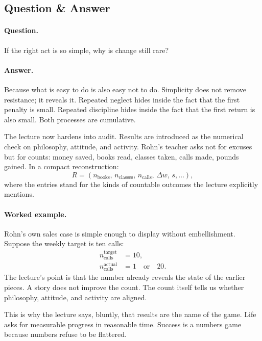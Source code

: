 \subsection{Question \& Answer}

\paragraph{Question.} If the right act is so simple, why is change still rare?

\paragraph{Answer.} Because what is easy to do is also easy not to do. Simplicity does not remove resistance; it reveals it. Repeated neglect hides inside the fact that the first penalty is small. Repeated discipline hides inside the fact that the first return is also small. Both processes are cumulative.

The lecture now hardens into audit. Results are introduced as the numerical check on philosophy, attitude, and activity. Rohn's teacher asks not for excuses but for counts: money saved, books read, classes taken, calls made, pounds gained. In a compact reconstruction:
\begin{equation}
R=(n_{\text{books}},\,n_{\text{classes}},\,n_{\text{calls}},\,\Delta w,\,s,\dots),
\end{equation}
where the entries stand for the kinds of countable outcomes the lecture explicitly mentions.

\paragraph{Worked example.} Rohn's own sales case is simple enough to display without embellishment. Suppose the weekly target is ten calls:
\begin{align}
n_{\text{calls}}^{\text{target}} &= 10,\\
n_{\text{calls}}^{\text{actual}} &= 1 \quad \text{or} \quad 20.
\end{align}
The lecture's point is that the number already reveals the state of the earlier pieces. A story does not improve the count. The count itself tells us whether philosophy, attitude, and activity are aligned.

This is why the lecture says, bluntly, that results are the name of the game. Life asks for measurable progress in reasonable time. Success is a numbers game because numbers refuse to be flattered.


